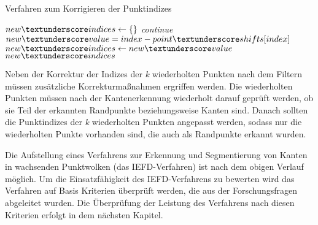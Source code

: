 \begin{algorithm}
	\caption{Verfahren zum Korrigieren der Punktindizes}
	\label{alg: correct_points}
	\begin{algorithmic}[1]
		\State $new\textunderscore indices \gets \{\}$
		\State \textit{continue}
		\EndIf
		\State $new\textunderscore value = index - point\textunderscore shifts[index]$
		\State $new\textunderscore indices \gets new\textunderscore value$
		\EndFor
		\Return $new\textunderscore indices$
		\EndFunction
	\end{algorithmic}
\end{algorithm}

Neben der Korrektur der Indizes der \textit{k} wiederholten Punkten nach dem Filtern müssen zusätzliche Korrekturmaßnahmen ergriffen werden. Die wiederholten Punkten müssen nach der Kantenerkennung wiederholt darauf geprüft werden, ob sie Teil der erkannten Randpunkte beziehungsweise Kanten sind. Danach sollten die Punktindizes der \textit{k} wiederholten Punkten angepasst werden, sodass nur die wiederholten Punkte vorhanden sind, die auch als Randpunkte erkannt wurden. 

Die Aufstellung eines Verfahrens zur Erkennung und Segmentierung von Kanten in wachsenden Punktwolken (das IEFD-Verfahren) ist nach dem obigen Verlauf möglich. Um die Einsatzfähigkeit des IEFD-Verfahrens zu bewerten wird das Verfahren auf Basis Kriterien überprüft werden, die aus der Forschungsfragen abgeleitet wurden. Die Überprüfung der Leistung des Verfahrens nach diesen Kriterien erfolgt in dem nächsten Kapitel.
